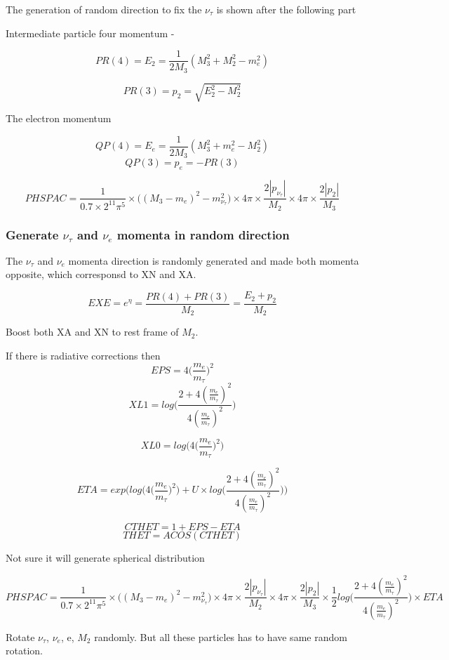 \documentclass[12pt]{article}
\begin{document}
The generation of random direction to fix the $\nu_\tau$ is shown after the following part


Intermediate particle four momentum - 

\[PR(4) = E_{2} =  \frac{1}{2M_3}(M_3^2 + M_2^2 - m_e^2)\]  

\[PR(3) = p_{2} = \sqrt{E_{2}^2 - M_2^2}\]

The electron momentum

\[QP(4) = E_e = \frac{1}{2M_3}(M_3^2 + m_e^2 - M_2^2)\]
\[QP(3) = p_e = -PR(3)\]

\[PHSPAC = \frac{1}{0.7 \times 2^{11} \pi^5} \times \Big((M_{3} - m_e)^2 - m_{\nu_\tau}^2\Big)\times 4\pi \times \frac{2|p_{\nu_\tau}|}{M_2} \times 4\pi \times \frac{2|p_2|}{M_3}\]


\subsubsection{Generate $\nu_\tau$ and $\nu_e$ momenta in random direction}

The $\nu_\tau$ and $\nu_e$ momenta direction is randomly generated and made both momenta opposite, which corresponsd to XN and XA.


\[EXE= e^\eta = \frac{PR(4)+PR(3)}{M_2} = \frac{E_2+p_2}{M_2}\]

Boost both XA and XN to rest frame of $M_2$. 


{\color{red} If there is radiative corrections then }\\

\[EPS =4 \Big(\frac{m_e}{m_\tau}\Big)^2\]
\[XL1 = log\Bigg(  \frac{2+4  (\frac{m_e}{m_\tau})^2 }{4  (\frac{m_e}{m_\tau})^2}       \Bigg)\]

\[XL0 = log\Bigg( 4 \Big(\frac{m_e}{m_\tau}\Big)^2 \Bigg)\]

\[ETA = exp\Bigg(log\Bigg( 4 \Big(\frac{m_e}{m_\tau}\Big)^2 \Bigg) + U \times log\Bigg(  \frac{2+4  (\frac{m_e}{m_\tau})^2 }{4  (\frac{m_e}{m_\tau})^2}       \Bigg)\Bigg)\]

\[CTHET = 1+EPS-ETA\]
\[THET =ACOS(CTHET) \]

Not sure it will generate spherical distribution

\[PHSPAC  = \frac{1}{0.7 \times 2^{11} \pi^5} \times \Big((M_{3} - m_e)^2 - m_{\nu_\tau}^2\Big)\times 4\pi \times \frac{2|p_{\nu_\tau}|}{M_2} \times 4\pi \times \frac{2|p_2|}{M_3} \times \frac{1}{2} log\Bigg(  \frac{2+4  (\frac{m_e}{m_\tau})^2 }{4  (\frac{m_e}{m_\tau})^2}       \Bigg) \times ETA\]

Rotate $\nu_\tau$, $\nu_e$, e, $M_2$ randomly. But all these particles has to have same random rotation.
\end{document}
